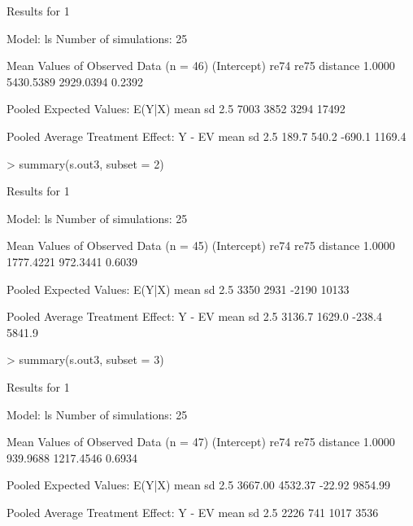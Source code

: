 \begin{enumerate}
\begin{Schunk}
\begin{Soutput}
Results for 1 

  Model: ls 
  Number of simulations: 25 

Mean Values of Observed Data (n = 46) 
(Intercept)        re74        re75    distance 
     1.0000   5430.5389   2929.0394      0.2392 

Pooled Expected Values: E(Y|X)
 mean    sd  2.5% 97.5% 
 7003  3852  3294 17492 

Pooled Average Treatment Effect: Y - EV
  mean     sd   2.5%  97.5% 
 189.7  540.2 -690.1 1169.4 


\end{Soutput}
\begin{Sinput}
> summary(s.out3, subset = 2)
\end{Sinput}
\begin{Soutput}

Results for 1 

  Model: ls 
  Number of simulations: 25 

Mean Values of Observed Data (n = 45) 
(Intercept)        re74        re75    distance 
     1.0000   1777.4221    972.3441      0.6039 

Pooled Expected Values: E(Y|X)
 mean    sd  2.5% 97.5% 
 3350  2931 -2190 10133 

Pooled Average Treatment Effect: Y - EV
  mean     sd   2.5%  97.5% 
3136.7 1629.0 -238.4 5841.9 


\end{Soutput}
\begin{Sinput}
> summary(s.out3, subset = 3)
\end{Sinput}
\begin{Soutput}

Results for 1 

  Model: ls 
  Number of simulations: 25 

Mean Values of Observed Data (n = 47) 
(Intercept)        re74        re75    distance 
     1.0000    939.9688   1217.4546      0.6934 

Pooled Expected Values: E(Y|X)
   mean      sd    2.5%   97.5% 
3667.00 4532.37  -22.92 9854.99 

Pooled Average Treatment Effect: Y - EV
 mean    sd  2.5% 97.5% 
 2226   741  1017  3536 


\end{Soutput}
\end{Schunk}
  

\end{enumerate}
